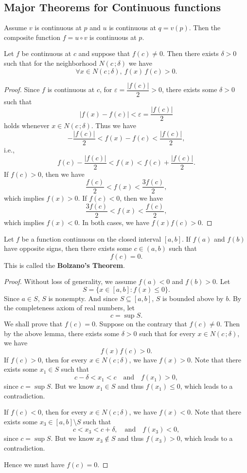 \documentclass[a4paper]{ctexart}
\begin{document}
	\subsection{Major Theorems for Continuous functions}
	\begin{mythm}
		Assume $v$ is continuous at $p$ and $u$ is continuous at $q=v(p)$. Then the composite function $f=u\circ v$ is continuous at $p$.
	\end{mythm}
	\begin{mylma}
		Let $f$ be continuous at $c$ and suppose that $f(c)\neq 0$.
		Then there exists $\delta>0$ such that for the neighborhood $N(c\,;\delta)$ we have
		\[
		\forall x\in N(c\,;\delta),\ f(x)\,f(c)>0 .
		\]
	\end{mylma}
	\begin{proof}
		Since $f$ is continuous at $c$, for $\varepsilon = \dfrac{|f(c)|}{2}>0$, there exists some $\delta>0$ such that
		\[
		|f(x)-f(c)|<\varepsilon = \frac{|f(c)|}{2}
		\]
		holds whenever $x\in N(c\,;\delta)$. Thus we have
		\[
		-\frac{|f(c)|}{2} < f(x)-f(c) < \frac{|f(c)|}{2},
		\]
		i.e.,
		\[
		f(c)-\frac{|f(c)|}{2} < f(x) < f(c)+\frac{|f(c)|}{2}.
		\]
		If $f(c)>0$, then we have
		\[
		\frac{f(c)}{2} < f(x) < \frac{3f(c)}{2},
		\]
		which implies $f(x)>0$. If $f(c)<0$, then we have
		\[
		\frac{3f(c)}{2} < f(x) < \frac{f(c)}{2},
		\]
		which implies $f(x)<0$. In both cases, we have $f(x)f(c)>0$.
	\end{proof}
	\begin{mythm}
		Let $f$ be a function continuous on the closed interval $[a,b]$. If $f(a)$ and $f(b)$ have opposite signs, then there exists some $c\in (a,b)$ such that
		\[
		f(c)=0.
		\]
		This is called the \textbf{Bolzano's Theorem}.
	\end{mythm}
	\begin{proof}
		Without loss of generality, we assume $f(a)<0$ and $f(b)>0$. Let
		\[
		S=\{ x\in [a,b] : f(x)\le 0 \}.
		\]
		Since $a\in S$, $S$ is nonempty. And since $S\subseteq [a,b]$, $S$ is bounded above by $b$. By the completeness axiom of real numbers, let
		\[
		c=\sup S.
		\]
		We shall prove that $f(c)=0$. Suppose on the contrary that $f(c)\neq 0$. Then by the above lemma, there exists some $\delta>0$ such that for every $x\in N(c\,;\delta)$, we have
		\[
		f(x)f(c)>0.
		\]
		If $f(c)>0$, then for every $x\in N(c\,;\delta)$, we have $f(x)>0$. Note that there exists some $x_1\in S$ such that
		\[
		c-\delta < x_1 < c\quad \text{and} \quad f(x_1) > 0,
		\]
		since $c=\sup S$. But we know $x_1\in S$ and thus $f(x_1) \le 0$, which leads to a contradiction.
		
		If $f(c)<0$, then for every $x\in N(c\,;\delta)$, we have $f(x)<0$. Note that there exists some $x_3\in [a,b]\setminus S$ such that
		\[
		c < x_3 < c+\delta, \quad \text{and} \quad f(x_3) < 0,
		\]
		since $c=\sup S$. But we know $x_3\notin S$ and thus $f(x_3) > 0$, which leads to a contradiction.

		Hence we must have $f(c)=0$.
	\end{proof}
\end{document}
